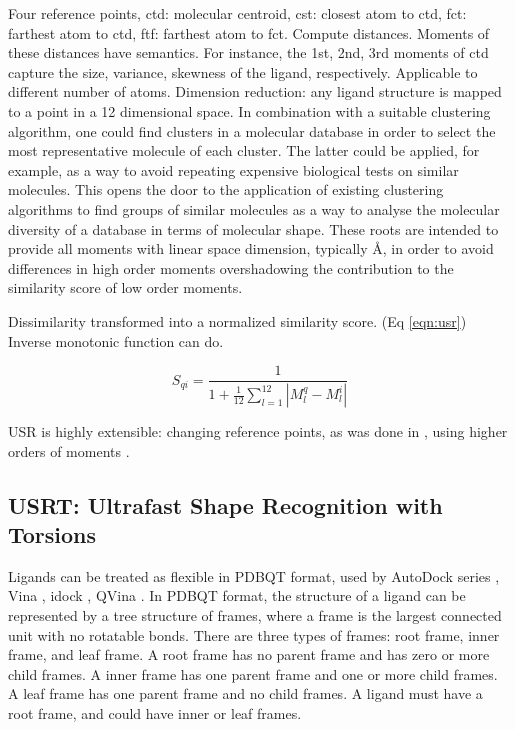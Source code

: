 \documentclass[twocolumn]{svjour3}          %
\begin{document}
Four reference points, ctd: molecular centroid, cst: closest atom to ctd, fct: farthest atom to ctd, ftf: farthest atom to fct. Compute distances. Moments of these distances have semantics. For instance, the 1st, 2nd, 3rd moments of ctd capture the size, variance, skewness of the ligand, respectively. Applicable to different number of atoms. Dimension reduction: any ligand structure is mapped to a point in a 12 dimensional space. In combination with a suitable clustering algorithm, one could find clusters in a molecular database in order to select the most representative molecule of each cluster. The latter could be applied, for example, as a way to avoid repeating expensive biological tests on similar molecules.  This opens the door to the application of existing clustering algorithms to find groups of similar molecules as a way to analyse the molecular diversity of a database in terms of molecular shape. These roots are intended to provide all moments with linear space dimension, typically \AA, in order to avoid differences in high order moments overshadowing the contribution to the similarity score of low order moments.

Dissimilarity transformed into a normalized similarity score. (Eq \ref{eqn:usr}) Inverse monotonic function can do.

\begin{equation}
S_{qi}=\frac{1}{1+\frac{1}{12}\sum_{l=1}^{12}|M_l^q-M_l^i|}
\label{eqn:usr}
\end{equation}

USR is highly extensible: changing reference points, as was done in \cite{1334,1335}, using higher orders of moments \cite{1333}.

\subsection{USRT: Ultrafast Shape Recognition with Torsions}

Ligands can be treated as flexible in PDBQT format, used by AutoDock series \cite{597,596}, Vina \cite{595}, idock \cite{1153}, QVina \cite{1193}. In PDBQT format, the structure of a ligand can be represented by a tree structure of frames, where a frame is the largest connected unit with no rotatable bonds. There are three types of frames: root frame, inner frame, and leaf frame. A root frame has no parent frame and has zero or more child frames. A inner frame has one parent frame and one or more child frames. A leaf frame has one parent frame and no child frames. A ligand must have a root frame, and could have inner or leaf frames.
\end{document}
